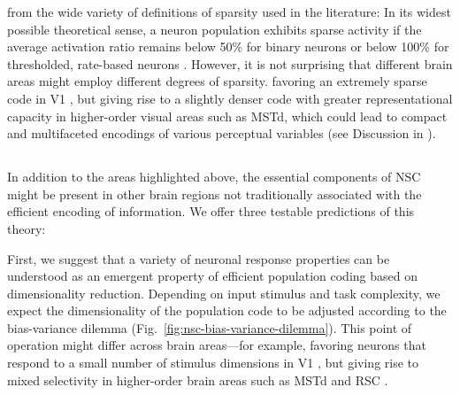  from the wide variety of definitions of sparsity
used in the literature:
In its widest possible theoretical sense,
a neuron population exhibits sparse activity if the average activation ratio
remains below 50\% for binary neurons 
or below 100\% for thresholded,
rate-based neurons \cite{SpanneJorntell2015}.
However, it is not surprising that different brain areas might employ
different degrees of sparsity.
favoring an extremely sparse code in \ac{V1}
\cite{OlshausenField1996},
but giving rise to a slightly denser code with 
greater representational capacity in higher-order visual areas
such as \ac{MSTd}, 
which could lead to compact and multifaceted encodings
of various perceptual variables
(see Discussion in \cite{Beyeler2016}).



\subsection*{}

In addition to the areas highlighted above, 
the essential components of \ac{NSC} might be present 
in other brain regions not traditionally associated 
with the efficient encoding of information.
We offer three testable predictions of this theory:

First, we suggest that a variety of neuronal response properties
can be understood as an emergent property of efficient population coding 
based on dimensionality reduction.
Depending on input stimulus and task complexity,
we expect the dimensionality of the population code to be adjusted
according to the bias-variance dilemma
(Fig.~\ref{fig:nsc-bias-variance-dilemma}).
This point of operation might differ across brain areas---for example,
favoring neurons that respond to a small number of stimulus dimensions
in \ac{V1} \cite{OlshausenField1996},
but giving rise to mixed selectivity in higher-order brain areas
such as \ac{MSTd} \cite{Beyeler2016} and
\ac{RSC} \cite{Rounds2016,Rounds2018}.

